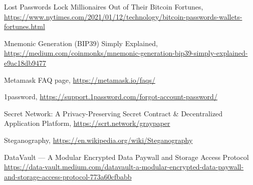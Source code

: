 \documentclass[12pt]{article}
\begin{document}
\begin{thebibliography}{9}

 Lost Passwords Lock Millionaires Out of Their Bitcoin Fortunes, \url{https://www.nytimes.com/2021/01/12/technology/bitcoin-passwords-wallets-fortunes.html}

 Mnemonic Generation (BIP39) Simply Explained, \url{https://medium.com/coinmonks/mnemonic-generation-bip39-simply-explained-e9ac18db9477}

 Metamask FAQ page, \url{https://metamask.io/faqs/}

 1password, \url{https://support.1password.com/forgot-account-password/}

 Secret Network: A Privacy-Preserving Secret Contract \& Decentralized Application Platform, \url{https://scrt.network/graypaper}

 Steganography, \url{https://en.wikipedia.org/wiki/Steganography}

 DataVault — A Modular Encrypted Data Paywall and Storage Access Protocol \url{https://data-vault.medium.com/datavault-a-modular-encrypted-data-paywall-and-storage-access-protocol-773a60cfbabb}

\end{thebibliography}
\end{document}
